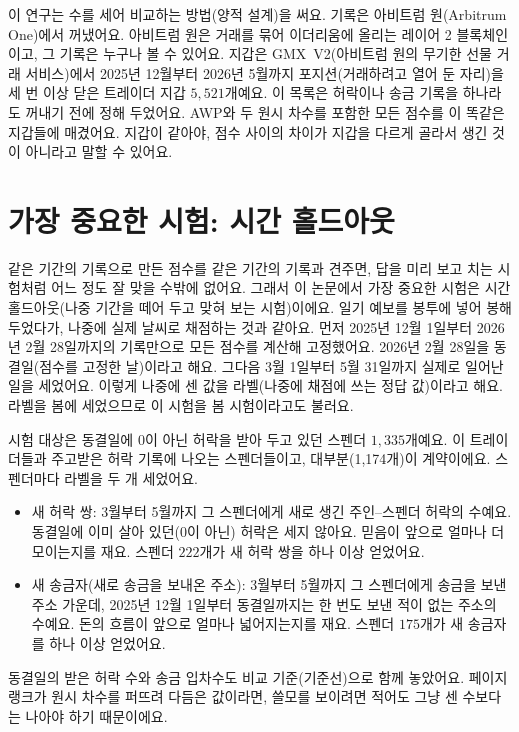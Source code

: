 이 연구는 수를 세어 비교하는 방법(양적 설계)을 써요. 기록은 아비트럼 원(Arbitrum One)에서 꺼냈어요. 아비트럼 원은 거래를 묶어 이더리움에 올리는 레이어 2 블록체인이고, 그 기록은 누구나 볼 수 있어요. 지갑은 GMX~V2(아비트럼 원의 무기한 선물 거래 서비스)에서 2025년 12월부터 2026년 5월까지 포지션(거래하려고 열어 둔 자리)을 세 번 이상 닫은 트레이더 지갑 $5{,}521$개예요. 이 목록은 허락이나 송금 기록을 하나라도 꺼내기 전에 정해 두었어요. AWP와 두 원시 차수를 포함한 모든 점수를 이 똑같은 지갑들에 매겼어요. 지갑이 같아야, 점수 사이의 차이가 지갑을 다르게 골라서 생긴 것이 아니라고 말할 수 있어요.

\section*{가장 중요한 시험: 시간 홀드아웃}

같은 기간의 기록으로 만든 점수를 같은 기간의 기록과 견주면, 답을 미리 보고 치는 시험처럼 어느 정도 잘 맞을 수밖에 없어요. 그래서 이 논문에서 가장 중요한 시험은 시간 홀드아웃(나중 기간을 떼어 두고 맞혀 보는 시험)이에요. 일기 예보를 봉투에 넣어 봉해 두었다가, 나중에 실제 날씨로 채점하는 것과 같아요. 먼저 2025년 12월 1일부터 2026년 2월 28일까지의 기록만으로 모든 점수를 계산해 고정했어요. 2026년 2월 28일을 동결일(점수를 고정한 날)이라고 해요. 그다음 3월 1일부터 5월 31일까지 실제로 일어난 일을 세었어요. 이렇게 나중에 센 값을 라벨(나중에 채점에 쓰는 정답 값)이라고 해요. 라벨을 봄에 세었으므로 이 시험을 봄 시험이라고도 불러요.

시험 대상은 동결일에 0이 아닌 허락을 받아 두고 있던 스펜더 $1{,}335$개예요. 이 트레이더들과 주고받은 허락 기록에 나오는 스펜더들이고, 대부분(1,174개)이 계약이에요. 스펜더마다 라벨을 두 개 세었어요.
\begin{itemize}
\item 새 허락 쌍: 3월부터 5월까지 그 스펜더에게 새로 생긴 주인--스펜더 허락의 수예요. 동결일에 이미 살아 있던(0이 아닌) 허락은 세지 않아요. 믿음이 앞으로 얼마나 더 모이는지를 재요. 스펜더 $222$개가 새 허락 쌍을 하나 이상 얻었어요.
\item 새 송금자(새로 송금을 보내온 주소): 3월부터 5월까지 그 스펜더에게 송금을 보낸 주소 가운데, 2025년 12월 1일부터 동결일까지는 한 번도 보낸 적이 없는 주소의 수예요. 돈의 흐름이 앞으로 얼마나 넓어지는지를 재요. 스펜더 $175$개가 새 송금자를 하나 이상 얻었어요.
\end{itemize}
동결일의 받은 허락 수와 송금 입차수도 비교 기준(기준선)으로 함께 놓았어요. 페이지랭크가 원시 차수를 퍼뜨려 다듬은 값이라면, 쓸모를 보이려면 적어도 그냥 센 수보다는 나아야 하기 때문이에요.

